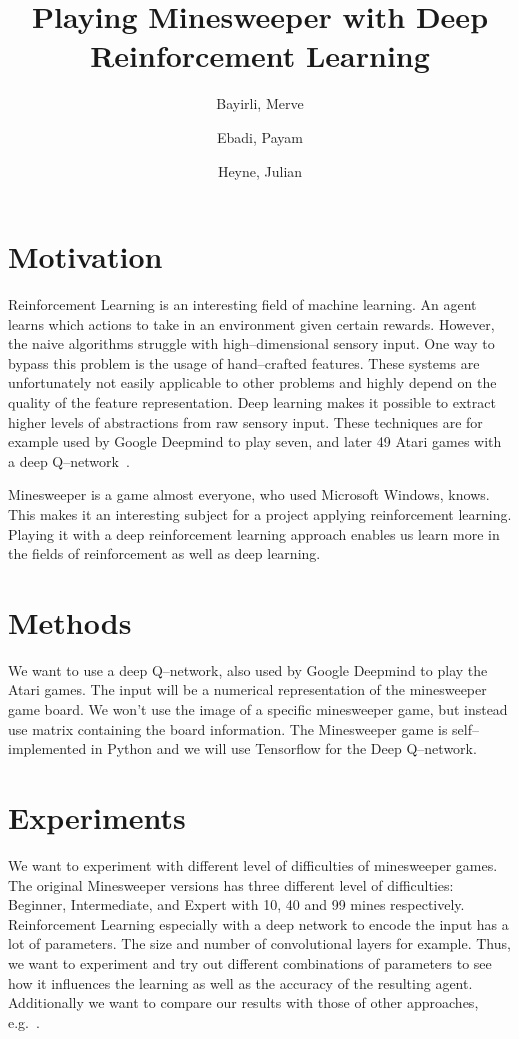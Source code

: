 \documentclass[Optionen]{scrartcl}
\title{Playing Minesweeper with Deep Reinforcement Learning}
\author{Bayirli, Merve \and Ebadi, Payam \and Heyne, Julian}
\begin{document}
    \maketitle
    \section{Motivation}
    Reinforcement Learning is an interesting field of machine learning.
    An agent learns which actions to take in an environment given certain rewards.
    However, the naive algorithms struggle with high--dimensional sensory input.
    One way to bypass this problem is the usage of hand--crafted features.
    These systems are unfortunately not easily applicable to other problems and highly depend on the quality of the feature representation.
    Deep learning makes it possible to extract higher levels of abstractions from raw sensory input.
    These techniques are for example used by Google Deepmind to play seven, and later 49 Atari games with a deep Q--network~\cite{mnih2013playing, mnih2015human}.
    
    Minesweeper is a game almost everyone, who used Microsoft Windows, knows.
    This makes it an interesting subject for a project applying reinforcement learning.
    Playing it with a deep reinforcement learning approach enables us learn more in the fields of reinforcement as well as deep learning.
    \section{Methods}
    We want to use a deep Q--network, also used by Google Deepmind to play the Atari games.
    The input will be a numerical representation of the minesweeper game board.
    We won't use the image of a specific minesweeper game, but instead use matrix containing the board information.
    The Minesweeper game is self--implemented in Python and we will use Tensorflow for the Deep Q--network.

    \section{Experiments}
    We want to experiment with different level of difficulties of minesweeper games.
    The original Minesweeper versions has three different level of difficulties: Beginner, Intermediate, and Expert with 10, 40 and 99 mines respectively.
    Reinforcement Learning especially with a deep network to encode the input has a lot of parameters.
    The size and number of convolutional layers for example.
    Thus, we want to experiment and try out different combinations of parameters to see how it influences the learning as well as the accuracy of the resulting agent.
    Additionally we want to compare our results with those of other approaches, e.g.~\cite{castillo2003learning}.
    
    \printbibliography
\end{document}
